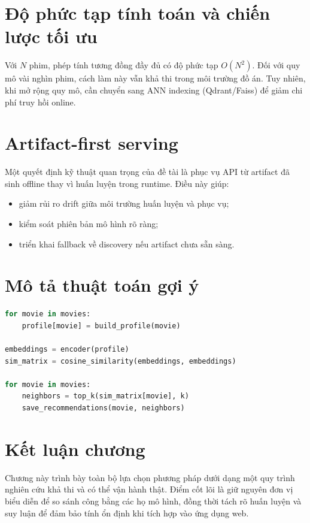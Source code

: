 \section{Độ phức tạp tính toán và chiến lược tối ưu}
Với $N$ phim, phép tính tương đồng đầy đủ có độ phức tạp $O(N^2)$. Đối với quy mô vài nghìn phim, cách làm này vẫn khả thi trong môi trường đồ án. Tuy nhiên, khi mở rộng quy mô, cần chuyển sang ANN indexing (Qdrant/Faiss) để giảm chi phí truy hồi online.

\section{Artifact-first serving}
Một quyết định kỹ thuật quan trọng của đề tài là phục vụ API từ artifact đã sinh offline thay vì huấn luyện trong runtime. Điều này giúp:
\begin{itemize}
    \item giảm rủi ro drift giữa môi trường huấn luyện và phục vụ;
    \item kiểm soát phiên bản mô hình rõ ràng;
    \item triển khai fallback về discovery nếu artifact chưa sẵn sàng.
\end{itemize}

\section{Mô tả thuật toán gợi ý}
\begin{lstlisting}[language=python,caption={Giả mã quy trình gợi ý phim tương đồng}]
for movie in movies:
    profile[movie] = build_profile(movie)

embeddings = encoder(profile)
sim_matrix = cosine_similarity(embeddings, embeddings)

for movie in movies:
    neighbors = top_k(sim_matrix[movie], k)
    save_recommendations(movie, neighbors)
\end{lstlisting}

\section{Kết luận chương}
Chương này trình bày toàn bộ lựa chọn phương pháp dưới dạng một quy trình nghiên cứu khả thi và có thể vận hành thật. Điểm cốt lõi là giữ nguyên đơn vị biểu diễn để so sánh công bằng các họ mô hình, đồng thời tách rõ huấn luyện và suy luận để đảm bảo tính ổn định khi tích hợp vào ứng dụng web.
